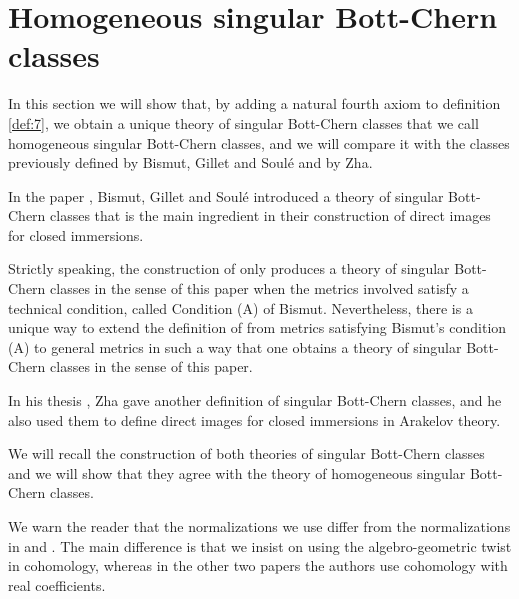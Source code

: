 \documentclass[10pt,twoside]{article}
\numberwithin{equation}{section}
\theoremstyle{plain}
\theoremstyle{definition}
\begin{document}
\section{Homogeneous singular Bott-Chern classes}
\label{sec:bismut-gillet-soule}

In this section we will show that, by adding a natural fourth axiom to
definition \ref{def:7}, we obtain a unique theory of singular
Bott-Chern classes that we call homogeneous singular Bott-Chern
classes, and we will compare it with the classes previously defined
by Bismut, Gillet and Soul\'e and by Zha.

In the paper \cite{BismutGilletSoule:MR1086887}, Bismut, Gillet and
Soul\'e introduced a theory of singular Bott-Chern classes that is
the main ingredient in their construction of direct images for
closed immersions.

Strictly speaking, the construction of
\cite{BismutGilletSoule:MR1086887} only produces a theory of  
singular Bott-Chern classes in the sense of this paper when the metrics
involved satisfy a technical condition, called Condition (A) of
Bismut. Nevertheless, there is a unique way to extend the definition of
\cite{BismutGilletSoule:MR1086887} from metrics satisfying Bismut's 
condition (A) to 
general metrics in such a way that one obtains a theory of singular
Bott-Chern classes in the sense of this paper.

In his thesis \cite{zha99:_rieman_roch}, Zha gave another
definition of singular Bott-Chern classes, and he also used them to
define direct 
images for closed immersions in Arakelov theory. 

We will recall the construction of both theories of singular
Bott-Chern classes and we will show that they agree with the theory
of homogeneous singular Bott-Chern classes.

 We warn
the reader that the normalizations we use differ from the
normalizations in \cite{BismutGilletSoule:MR1086887} and
\cite{zha99:_rieman_roch}. The 
main difference is that we insist on using the
algebro-geometric twist in cohomology, whereas in the other two papers
the 
authors 
use cohomology with real coefficients. 
\end{document}
